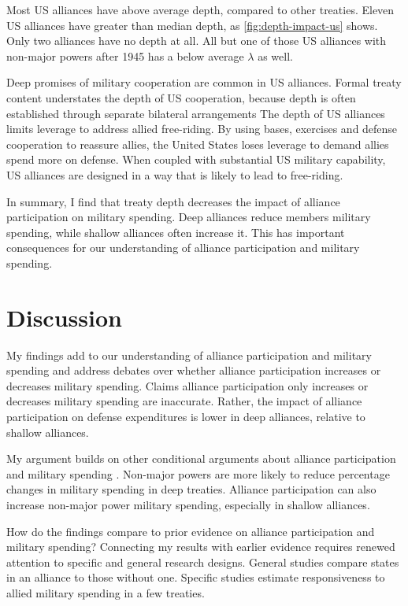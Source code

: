 \documentclass[12pt]{article}
\begin{document}
Most US alliances have above average depth, compared to other treaties. 
Eleven US alliances have greater than median depth, as \autoref{fig:depth-impact-us} shows.
Only two alliances have no depth at all.  
All but one of those US alliances with non-major powers after 1945 has a below average $\lambda$ as well. 


Deep promises of military cooperation are common in US alliances. 
Formal treaty content understates the depth of US cooperation, because depth is often established through separate bilateral arrangements  
The depth of US alliances limits leverage to address allied free-riding. 
By using bases, exercises and defense cooperation to reassure allies, the United States loses leverage to demand allies spend more on defense. 
When coupled with substantial US military capability, US alliances are designed in a way that is likely to lead to free-riding. 


In summary, I find that treaty depth decreases the impact of alliance participation on military spending. 
Deep alliances reduce members military spending, while shallow alliances often increase it. 
This has important consequences for our understanding of alliance participation and military spending. 



\section{Discussion}


My findings add to our understanding of alliance participation and military spending and address debates over whether alliance participation increases or decreases military spending. 
Claims alliance participation only increases or decreases military spending are inaccurate. 
Rather, the impact of alliance participation on defense expenditures is lower in deep alliances, relative to shallow alliances.


My argument builds on other conditional arguments about alliance participation and military spending \citep{DigiuseppePoast2016}. 
Non-major powers are more likely to reduce percentage changes in military spending in deep treaties.
Alliance participation can also increase non-major power military spending, especially in shallow alliances. 


How do the findings compare to prior evidence on alliance participation and military spending? 
Connecting my results with earlier evidence requires renewed attention to specific and general research designs. 
General studies compare states in an alliance to those without one. 
Specific studies estimate responsiveness to allied military spending in a few treaties. 
\end{document}
